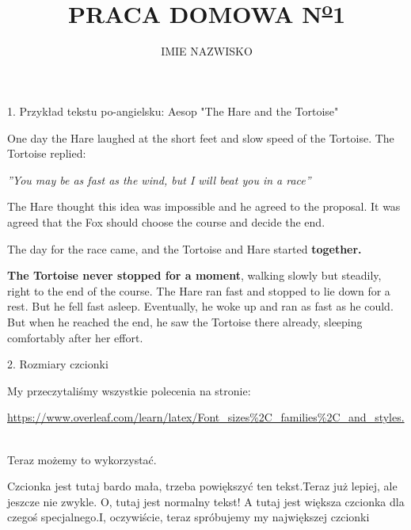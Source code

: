 \documentclass[a4paper,10pt]{article}
\title{\textbf{PRACA DOMOWA N\textsuperscript{\underline{o}}1}}
\author{{\scriptsize IMIE NAZWISKO}}
\begin{document}
\sloppy
\maketitle
\item{1.} Przykład tekstu po-angielsku: Aesop "The Hare and the Tortoise" \hfill{}
\newline  \par
 One day the Hare laughed at the short
feet and slow speed of the Tortoise. The
Tortoise replied:\par 
\it ''You may be as fast as the wind, but
I will beat you in a race''\par
\rm
The Hare thought this idea was impossible and he agreed to the proposal.
It was agreed that the Fox should choose
the course and decide the end.\par
The day for the race came, and the
Tortoise and Hare started \textbf{together.}\par
\textbf{The Tortoise never stopped for
a moment}, walking slowly but steadily,
right to the end of the course. The Hare
ran fast and stopped to lie down for a
rest. But he fell fast asleep. Eventually,
he woke up and ran as fast as he could.
But when he reached the end, he saw the
Tortoise there already, sleeping comfortably after her effort.
\begin{center} 2. Rozmiary czcionki 
\end{center}
\par My przeczytaliśmy wszystkie polecenia na stronie:\par
\mbox{\url{https://www.overleaf.com/learn/latex/Font_sizes\%2C_families\%2C_and_styles.} }
\par Teraz możemy to wykorzystać.\par
{\tiny Czcionka jest tutaj bardo mała, trzeba powiększyć
ten tekst}.{\footnotesize Teraz już lepiej, ale jeszcze nie
zwykle.} O, tutaj jest normalny tekst!
{\large A tutaj jest większa czcionka dla
czegoś specjalnego.}{\huge I, oczywiście, teraz spróbujemy my największej
czcionki}
\end{document}
